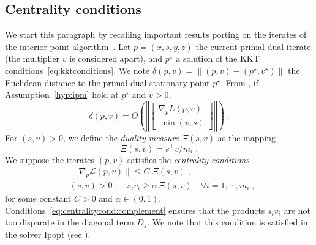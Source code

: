 \subsection{Centrality conditions}
We start this paragraph by recalling important results porting
on the iterates of the interior-point algorithm~\cite{wright2001effects}.
Let $p = (x, s, y, z)$ the current primal-dual iterate (the multiplier $v$ is considered apart),
and $p^\star$ a solution of the KKT conditions~\eqref{eq:kktconditions}.
We note $\delta(p, v) = \| (p, v) - (p^\star, v^\star) \|$ the Euclidean distance to the
primal-dual stationary point $p^\star$.
From \cite[Theorem 2.2]{wright2001effects}, if Assumption~\ref{hyp:ipm}
hold at $p^\star$ and $v > 0$,
\begin{equation}
  \delta(p, v) = \Theta\left( \left\Vert \begin{bmatrix}
      \nabla_p L(p, v) \\ \min(v, s)
  \end{bmatrix}
  \right\Vert \right) \; .
\end{equation}
For $(s, v) > 0$, we define the \emph{duality measure} $\Xi(s, v)$ as the mapping
\begin{equation}
  \Xi(s, v) = s^\top v / m_i \; .
\end{equation}
We suppose the iterates $(p, v)$ satisfies the \emph{centrality conditions}
\begin{subequations}
  \label{eq:centralitycond}
  \begin{align}
    & \| \nabla_p \mathcal{L}(p, v) \| \leq C \; \Xi(s, v) \;,  \\
    \label{eq:centralitycond:complement}
    & (s, v) > 0 \;,\quad s_i v_i \geq \alpha \, \Xi(s, v) \quad \forall i =1, \cdots, m_i \; ,
  \end{align}
\end{subequations}
for some constant $C > 0$ and $\alpha \in (0, 1)$.
Conditions~\eqref{eq:centralitycond:complement} ensures that the products
$s_i v_i$ are not too disparate in the diagonal term $D_s$.
We note that this condition is satisfied in the solver Ipopt (see \cite[Equation (16)]{wachter2006implementation}).


